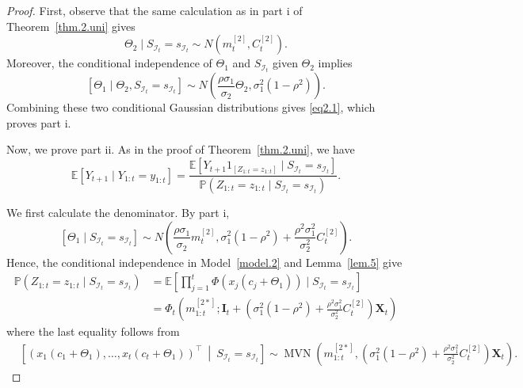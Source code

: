 \documentclass[11pt,authoryear]{elsarticle}
\def\P#1{{\mathbb{P}}\left(#1\right)}
\def\E#1{{\mathbb E}\left[#1\right]}
\theoremstyle{nopunct}
\numberwithin{equation}{section}
\begin{document}
\begin{proof}
First, observe that 
the same calculation as in part i of Theorem~\ref{thm.2.uni} gives
\[
\Theta_2
\mid
S_{\mathcal I_t}=s_{\mathcal I_t}
\sim
N(m_t^{[2]},C_t^{[2]}).
\]
Moreover, the conditional
independence of \(\Theta_1\) and \(S_{\mathcal I_t}\) given
\(\Theta_2\) implies
\[
\left[\Theta_1
\mid
\Theta_2,
S_{\mathcal I_t}=s_{\mathcal I_t}\right]
\sim
N\left(
\frac{\rho\sigma_1}{\sigma_2}\Theta_2,
\sigma_1^2(1-\rho^2)
\right).
\]
Combining these two conditional Gaussian distributions gives
\eqref{eq2.1}, which proves part i.

Now, we prove part ii.
As in the proof of Theorem~\ref{thm.2.uni}, we have
\begin{equation}\label{eq.conditional.mean.biv}
\E{
Y_{t+1}
\mid
Y_{1:t}=y_{1:t}
}
=
\frac{
\E{
Y_{t+1}1_{\left[Z_{1:t}=z_{1:t}\right]}
\mid
S_{\mathcal I_t}=s_{\mathcal I_t}
}
}{
\P{
Z_{1:t}=z_{1:t}
\mid
S_{\mathcal I_t}=s_{\mathcal I_t}
}
}.
\end{equation}

We first calculate the denominator.
By part i,
\begin{equation}\label{eq.24}
\left[\Theta_1
\mid
S_{\mathcal I_t}=s_{\mathcal I_t}\right]
\sim
N\left(
\frac{\rho\sigma_1}{\sigma_2}m_t^{[2]},
\sigma_1^2(1-\rho^2)
+
\frac{\rho^2\sigma_1^2}{\sigma_2^2}C_t^{[2]}
\right).
\end{equation}
Hence, the conditional independence in Model~\ref{model.2}
and Lemma~\ref{lem.5} give
\begin{equation}\label{eq.denominator.biv}
\begin{aligned}
\P{
Z_{1:t}=z_{1:t}
\mid
S_{\mathcal I_t}=s_{\mathcal I_t}
}
&=
\E{
\prod_{j=1}^t
\Phi\left(
x_j(c_j+\Theta_1)
\right)
\mid
S_{\mathcal I_t}=s_{\mathcal I_t}
}\\
&=
\Phi_t
\left(
m_{1:t}^{[2*]};
\boldsymbol I_t
+
\left(
\sigma_1^2(1-\rho^2)
+
\frac{\rho^2\sigma_1^2}{\sigma_2^2}C_t^{[2]}
\right)
\boldsymbol X_t
\right)
\end{aligned}
\end{equation}
where the last equality follows from
\[
\begin{aligned}
&\left[
\left(
x_1(c_1+\Theta_1),
\ldots,
x_t(c_t+\Theta_1)
\right)^\top
\ \middle|\
S_{\mathcal I_t}=s_{\mathcal I_t}
\right]\sim
\operatorname{MVN}
\left(
m_{1:t}^{[2*]},
\left(
\sigma_1^2(1-\rho^2)
+
\frac{\rho^2\sigma_1^2}{\sigma_2^2}C_t^{[2]}
\right)
\boldsymbol X_t
\right).
\end{aligned}
\]



\end{proof}
\end{document}
